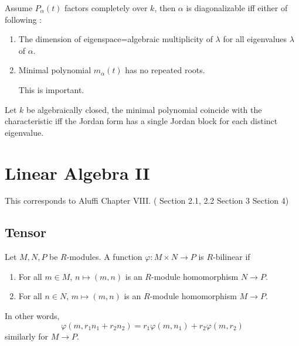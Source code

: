 \documentclass[openany]{book}
\begin{document}
\begin{prop}
    Assume $P_\alpha(t)$ factors completely over $k$, then $\alpha$ is diagonalizable iff either of following :
    \begin{enumerate}
        \item The dimension of eigenspace=algebraic multiplicity of $\lambda$ for all eigenvalues $\lambda$ of $\alpha$.
        \item Minimal polynomial $m_\alpha(t)$ has no repeated roots.
        \begin{warn}
            This is important.
        \end{warn}
    \end{enumerate}
\end{prop}

\begin{prop}
    Let $k$ be algebraically closed, the minimal polynomial coincide with the characteristic iff the Jordan form has a single Jordan block for each distinct eigenvalue.
\end{prop}





















\chapter{Linear Algebra II}
This corresponds to Aluffi Chapter VIII. (
Section 2.1, 2.2
Section 3
Section 4)

\section{Tensor}

\begin{defn}[bilinear]
    Let $M,N,P$ be $R$-modules. A function $\varphi: M\times N\to P$ is $R$-bilinear if 
    \begin{enumerate}
        \item For all $m\in M$, $n\mapsto(m,n)$ is an $R$-module homomorphism $N\to P$.
        \item For all $n\in N$, $m\mapsto(m,n)$ is an $R$-module homomorphism $M\to P$.
    \end{enumerate}
    In other words, 
    \begin{equation*}
        \varphi(m,r_1n_1+r_2n_2)=r_1\varphi(m,n_1)+r_2\varphi(m,r_2)
    \end{equation*}
    similarly for $M\to P$.
\end{defn}
\end{document}

